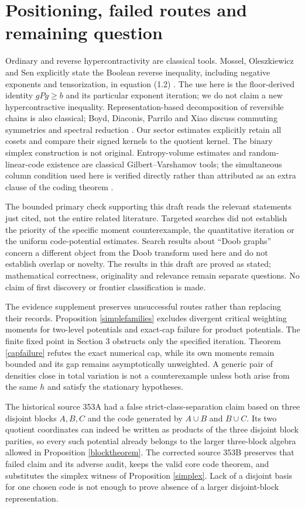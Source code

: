 \documentclass[11pt]{article}
\begin{document}
\section{Positioning, failed routes and remaining question}
Ordinary and reverse hypercontractivity are classical tools. Mossel, Oleszkiewicz and Sen explicitly state the Boolean reverse inequality, including negative exponents and tensorization, in equation (1.2) \cite{mos}. The use here is the floor-derived identity $gPg\geq b$ and its particular exponent iteration; we do not claim a new hypercontractive inequality. Representation-based decomposition of reversible chains is also classical; Boyd, Diaconis, Parrilo and Xiao discuss commuting symmetries and spectral reduction \cite{boyd}. Our sector estimates explicitly retain all cosets and compare their signed kernels to the quotient kernel. The binary simplex construction is not original. Entropy-volume estimates and random-linear-code existence are classical Gilbert--Varshamov tools; the simultaneous column condition used here is verified directly rather than attributed as an extra clause of the coding theorem \cite{guruswami}.

The bounded primary check supporting this draft reads the relevant statements just cited, not the entire related literature. Targeted searches did not establish the priority of the specific moment counterexample, the quantitative iteration or the uniform code-potential estimates. Search results about ``Doob graphs'' concern a different object from the Doob transform used here and do not establish overlap or novelty. The results in this draft are proved as stated; mathematical correctness, originality and relevance remain separate questions. No claim of first discovery or frontier classification is made.

The evidence supplement preserves unsuccessful routes rather than replacing their records. Proposition \ref{simplefamilies} excludes divergent critical weighting moments for two-level potentials and exact-cap failure for product potentials. The finite fixed point in Section 3 obstructs only the specified iteration. Theorem \ref{capfailure} refutes the exact numerical cap, while its own moments remain bounded and its gap remains asymptotically unweighted. A generic pair of densities close in total variation is not a counterexample unless both arise from the same $h$ and satisfy the stationary hypotheses.

The historical source 353A had a false strict-class-separation claim based on three disjoint blocks $A,B,C$ and the code generated by $A\cup B$ and $B\cup C$. Its two quotient coordinates can indeed be written as products of the three disjoint block parities, so every such potential already belongs to the larger three-block algebra allowed in Proposition \ref{blocktheorem}. The corrected source 353B preserves that failed claim and its adverse audit, keeps the valid core code theorem, and substitutes the simplex witness of Proposition \ref{simplex}. Lack of a disjoint basis for one chosen code is not enough to prove absence of a larger disjoint-block representation.
\end{document}
